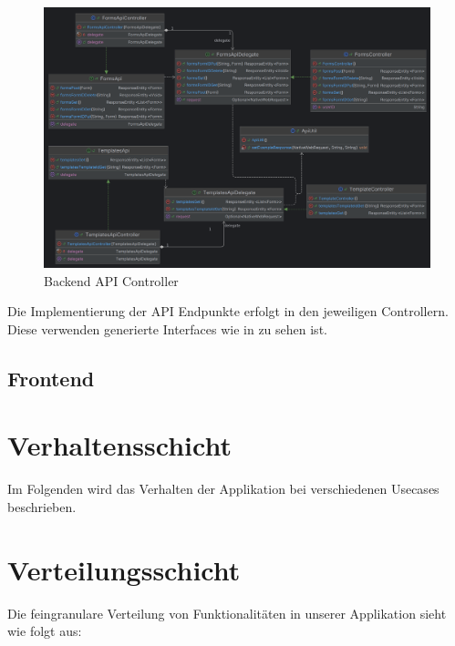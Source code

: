 \begin{figure}[H]
    \centering
    \includegraphics[width=15cm]{images/classDiagrams/Api}
    \caption{Backend API Controller}\label{fig:Backend-API-Controller}
\end{figure}

Die Implementierung der \ac{API} Endpunkte erfolgt in den jeweiligen Controllern.
Diese verwenden generierte Interfaces wie in  zu sehen ist.

\subsection{Frontend}





\section{Verhaltensschicht}\label{sec:verhaltensschicht}
Im Folgenden wird das Verhalten der Applikation bei verschiedenen Usecases beschrieben.

\section{Verteilungsschicht}\label{sec:verteilungsschicht}
Die feingranulare Verteilung von Funktionalitäten in unserer Applikation sieht wie folgt aus: